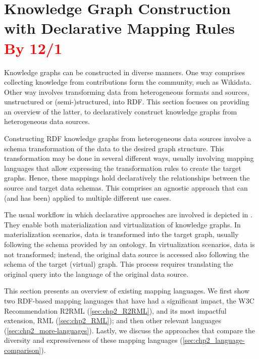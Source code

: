 \section{Knowledge Graph Construction with Declarative Mapping Rules \textcolor{red}{By 12/1}}
\label{sec:chp2_declarative_kgc}

Knowledge graphs can be constructed in diverse manners. One way comprises collecting knowledge from contributions form the community, such as Wikidata. Other way involves transforming data from heterogeneous formats and sources, unstructured or (semi-)structured, into RDF. This section focuses on providing an overview of the latter, to declaratively construct knowledge graphs from heterogeneous data sources.




Constructing RDF knowledge graphs from heterogeneous data sources involve a schema transformation of the data to the desired graph structure. This transformation may be done in several different ways, usually involving mapping languages that allow expressing the transformation rules to create the target graphs. Hence, these mappings hold declaratively the relationships between the source and target data schemas. This comprises an agnostic approach that can (and has been) applied to multiple different use cases. 

The usual workflow in which declarative approaches are involved is depicted in . They enable both materialization and virtualization of knowledge graphs. In materialization scenarios, data is transformed into the target graph, usually following the schema provided by an ontology. In virtualization scenarios, data is not transformed; instead, the original data source is accessed also following the schema of the target (virtual) graph. This process requires translating the original query into the language of the original data source. 

This section presents an overview of existing mapping languages.  We first show two RDF-based mapping languages that have had a significant impact, the W3C Recommendation R2RML (\cref{sec:chp2_R2RML}), and its most impactful extension, RML (\cref{sec:chp2_RML}); and then other relevant languages (\cref{sec:chp2_more-languages}). Lastly, we discuss the approaches that compare the diversity and expressiveness of these mapping languages (\cref{sec:chp2_language-comparison}).






